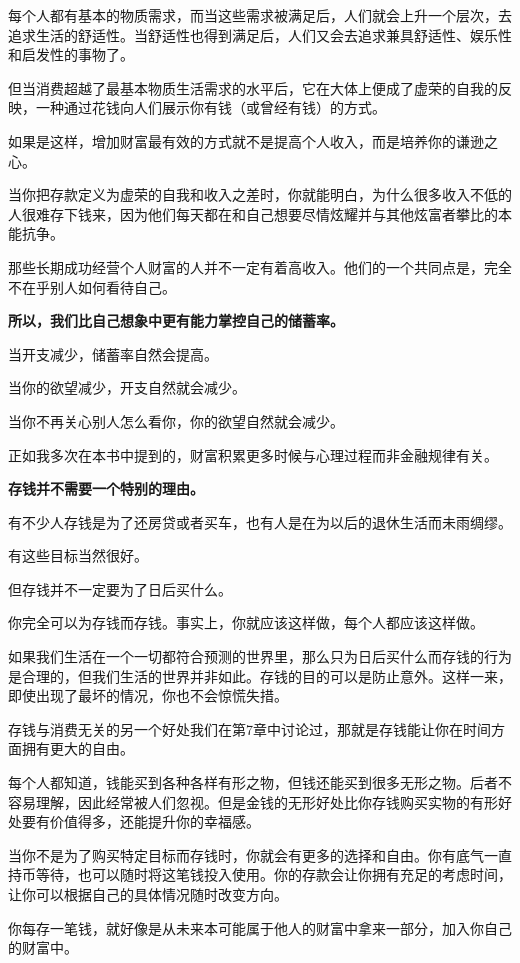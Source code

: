 每个人都有基本的物质需求，而当这些需求被满足后，人们就会上升一个层次，去追求生活的舒适性。当舒适性也得到满足后，人们又会去追求兼具舒适性、娱乐性和启发性的事物了。

但当消费超越了最基本物质生活需求的水平后，它在大体上便成了虚荣的自我的反映，一种通过花钱向人们展示你有钱（或曾经有钱）的方式。

如果是这样，增加财富最有效的方式就不是提高个人收入，而是培养你的谦逊之心。

当你把存款定义为虚荣的自我和收入之差时，你就能明白，为什么很多收入不低的人很难存下钱来，因为他们每天都在和自己想要尽情炫耀并与其他炫富者攀比的本能抗争。

那些长期成功经营个人财富的人并不一定有着高收入。他们的一个共同点是，完全不在乎别人如何看待自己。

\textbf{所以，我们比自己想象中更有能力掌控自己的储蓄率。}

当开支减少，储蓄率自然会提高。

当你的欲望减少，开支自然就会减少。

当你不再关心别人怎么看你，你的欲望自然就会减少。

正如我多次在本书中提到的，财富积累更多时候与心理过程而非金融规律有关。

\textbf{存钱并不需要一个特别的理由。}

有不少人存钱是为了还房贷或者买车，也有人是在为以后的退休生活而未雨绸缪。

有这些目标当然很好。

但存钱并不一定要为了日后买什么。

你完全可以为存钱而存钱。事实上，你就应该这样做，每个人都应该这样做。

如果我们生活在一个一切都符合预测的世界里，那么只为日后买什么而存钱的行为是合理的，但我们生活的世界并非如此。存钱的目的可以是防止意外。这样一来，即使出现了最坏的情况，你也不会惊慌失措。

存钱与消费无关的另一个好处我们在第7章中讨论过，那就是存钱能让你在时间方面拥有更大的自由。

每个人都知道，钱能买到各种各样有形之物，但钱还能买到很多无形之物。后者不容易理解，因此经常被人们忽视。但是金钱的无形好处比你存钱购买实物的有形好处要有价值得多，还能提升你的幸福感。

当你不是为了购买特定目标而存钱时，你就会有更多的选择和自由。你有底气一直持币等待，也可以随时将这笔钱投入使用。你的存款会让你拥有充足的考虑时间，让你可以根据自己的具体情况随时改变方向。

你每存一笔钱，就好像是从未来本可能属于他人的财富中拿来一部分，加入你自己的财富中。

